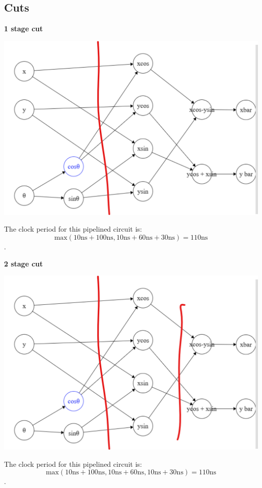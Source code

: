 \documentclass[12pt]{article}
\newenvironment{subquestion}[1]{\subsection{#1}
\begin{tcolorbox}[colback=blue!2!white,colframe=blue!20!white]}{\end{tcolorbox}}
\newcommand{\ns}{\text{ns}}
\begin{document}
        \begin{subquestion}{Cuts}
            \begin{description}
                \item \textbf{1 stage cut} \\
                    \begin{center}
                        \includegraphics[scale = 0.5]{Images/1 stage cut.png}
                    \end{center}
                    The clock period for this pipelined circuit is: $$\text{max}(10\ns + 100\ns, 10\ns + 60\ns + 30\ns) = 110\ns$$.
                \item \textbf{2 stage cut} \\
                    \begin{center}
                        \includegraphics[scale = 0.5]{Images/2 stage cut.png}
                    \end{center}
                    The clock period for this pipelined circuit is: $$\text{max}(10\ns + 100\ns, 10\ns + 60\ns, 10\ns + 30\ns) = 110\ns$$.
            \end{description}
        \end{subquestion}
\end{document}
